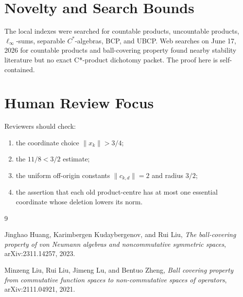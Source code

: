 \documentclass[11pt]{article}
\begin{document}
\section*{Novelty and Search Bounds}

The local indexes were searched for countable products, uncountable products,
\(\ell_\infty\)-sums, separable \(C^*\)-algebras, BCP, and UBCP.  Web searches
on June 17, 2026 for countable products and ball-covering property found
nearby stability literature but no exact C*-product dichotomy packet.  The
proof here is self-contained.

\section*{Human Review Focus}

Reviewers should check:
\begin{enumerate}
    \item the coordinate choice \(\|x_k\|>3/4\);
    \item the \(11/8<3/2\) estimate;
    \item the uniform off-origin constants \(\|c_{k,d}\|=2\) and radius
          \(3/2\);
    \item the assertion that each old product-centre has at most one
          essential coordinate whose deletion lowers its norm.
\end{enumerate}

\begin{thebibliography}{9}

Jinghao Huang, Karimbergen Kudaybergenov, and Rui Liu,
\emph{The ball-covering property of von Neumann algebras and noncommutative
symmetric spaces},
arXiv:2311.14257, 2023.

Minzeng Liu, Rui Liu, Jimeng Lu, and Bentuo Zheng,
\emph{Ball covering property from commutative function spaces to
non-commutative spaces of operators},
arXiv:2111.04921, 2021.

\end{thebibliography}
\end{document}
